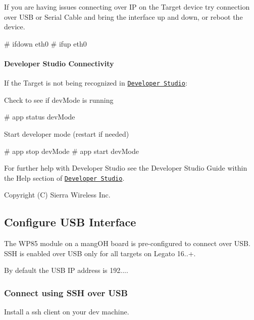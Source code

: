 \begin{DoxyItemize}
\item If you are having issues connecting over IP on the Target device try connection over U\+SB or Serial Cable and bring the interface up and down, or reboot the device.
\end{DoxyItemize}

\begin{DoxyVerb}# ifdown eth0
# ifup eth0
\end{DoxyVerb}
\hypertarget{basicTargetConfigETH_targetEthTroubleDS}{}\paragraph{Developer Studio Connectivity}\label{basicTargetConfigETH_targetEthTroubleDS}
If the Target is not being recognized in \href{https://source.sierrawireless.com/resources/airprime/software/developer-studio-installinstructions}{\tt Developer Studio}\+:

Check to see if {\ttfamily dev\+Mode} is running

\begin{DoxyVerb}# app status devMode
\end{DoxyVerb}


Start developer mode (restart if needed)

\begin{DoxyVerb}# app stop devMode
# app start devMode
\end{DoxyVerb}


For further help with Developer Studio see the Developer Studio Guide within the Help section of \href{https://source.sierrawireless.com/resources/airprime/software/developer-studio-installinstructions}{\tt Developer Studio}.

Copyright (C) Sierra Wireless Inc. \hypertarget{basicTargetConfigUSB}{}\subsection{Configure U\+SB Interface}\label{basicTargetConfigUSB}
The W\+P85 module on a mang\+OH board is pre-\/configured to connect over U\+SB. S\+SH is enabled over U\+SB only for all targets on Legato 16..+.

By default the U\+SB IP address is 192....\hypertarget{basicTargetConfigUSB_targetUSBConnect}{}\subsubsection{Connect using S\+S\+H over U\+SB}\label{basicTargetConfigUSB_targetUSBConnect}
Install a ssh client on your dev machine.

